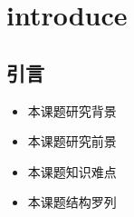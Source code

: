 \chapter{introduce}
\section{引言}
        \begin{itemize}
            \item 本课题研究背景
            \item 本课题研究前景
            \item 本课题知识难点
            \item 本课题结构罗列
        \end{itemize}